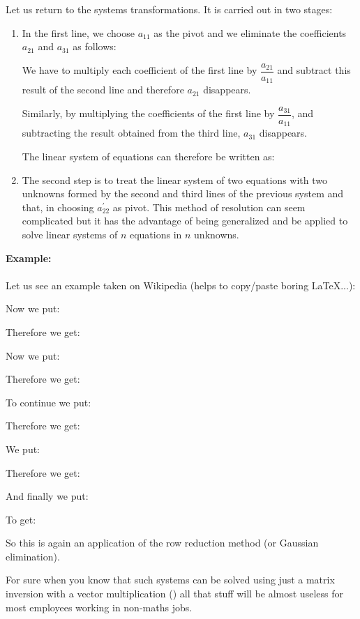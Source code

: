		Let us return to the systems transformations. It is carried out in two stages:
		\begin{enumerate}
			\item In the first line, we choose $a_{11}$ as the pivot and we eliminate the coefficients $a_{21}$ and $a_{31}$ as follows:
			
			We have to multiply each coefficient of the first line by $\dfrac{a_{21}}{a_{11}}$ and subtract this result of the second line and therefore $a_{21}$ disappears.
			
			Similarly, by multiplying the coefficients of the first line by $\dfrac{a_{31}}{a_{11}}$, and subtracting the result obtained from the third line, $a_{31}$ disappears.
			
			The linear system of equations can therefore be written as:
			
			\item The second step is to treat the linear system of two equations with two unknowns formed by the second and third lines of the previous system and that, in choosing $a_{22}^{'}$ as pivot. This method of resolution can seem complicated but it has the advantage of being generalized and be applied to solve linear systems of $n$ equations in $n$ unknowns.
		\end{enumerate}
		
		\begin{tcolorbox}[colframe=black,colback=white,sharp corners]
		\textbf{{\Large {}}Example:}\\\\
		Let us see an example taken on Wikipedia (helps to copy/paste boring \LaTeX ...):
		
		Now we put:
		
		Therefore we get:
		
		Now we put:
		
		Therefore we get:
		
		\end{tcolorbox}
		\begin{tcolorbox}[colframe=black,colback=white,sharp corners]
		To continue we put:
		
		Therefore we get:
		
		We put:
		
		Therefore we get:
		
		And finally we put:
		
		To get:
		
		So this is again an application of the row reduction method (or Gaussian elimination).
	\end{tcolorbox}
	For sure when you know that such systems can be solved using just a matrix inversion with a vector multiplication () all that stuff will be almost useless for most employees working in non-maths jobs.

